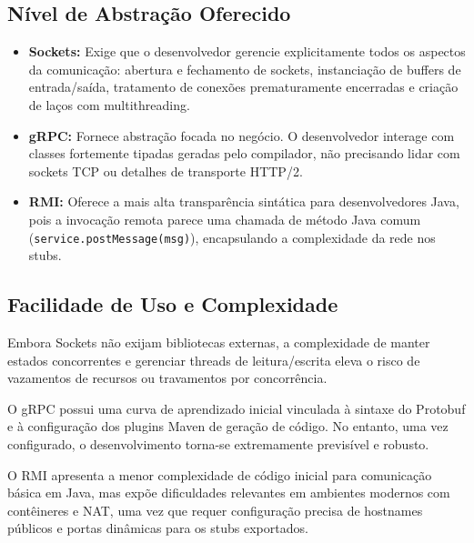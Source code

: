 \documentclass[12pt,a4paper]{article}
\begin{document}
\subsection{Nível de Abstração Oferecido}
\begin{itemize}
    \item \textbf{Sockets:} Exige que o desenvolvedor gerencie explicitamente todos os aspectos da comunicação: abertura e fechamento de sockets, instanciação de buffers de entrada/saída, tratamento de conexões prematuramente encerradas e criação de laços com multithreading.
    \item \textbf{gRPC:} Fornece abstração focada no negócio. O desenvolvedor interage com classes fortemente tipadas geradas pelo compilador, não precisando lidar com sockets TCP ou detalhes de transporte HTTP/2.
    \item \textbf{RMI:} Oferece a mais alta transparência sintática para desenvolvedores Java, pois a invocação remota parece uma chamada de método Java comum (\texttt{service.postMessage(msg)}), encapsulando a complexidade da rede nos stubs.
\end{itemize}

\subsection{Facilidade de Uso e Complexidade}
Embora Sockets não exijam bibliotecas externas, a complexidade de manter estados concorrentes e gerenciar threads de leitura/escrita eleva o risco de vazamentos de recursos ou travamentos por concorrência. 

O gRPC possui uma curva de aprendizado inicial vinculada à sintaxe do Protobuf e à configuração dos plugins Maven de geração de código. No entanto, uma vez configurado, o desenvolvimento torna-se extremamente previsível e robusto.

O RMI apresenta a menor complexidade de código inicial para comunicação básica em Java, mas expõe dificuldades relevantes em ambientes modernos com contêineres e NAT, uma vez que requer configuração precisa de hostnames públicos e portas dinâmicas para os stubs exportados.
\end{document}
